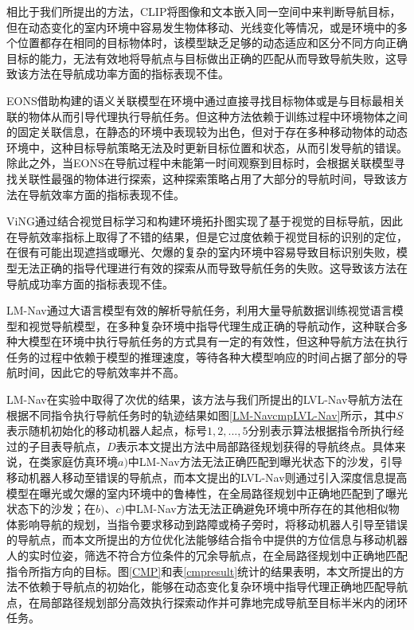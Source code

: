 相比于我们所提出的方法，CLIP将图像和文本嵌入同一空间中来判断导航目标，但在动态变化的室内环境中容易发生物体移动、光线变化等情况，或是环境中的多个位置都存在相同的目标物体时，该模型缺乏足够的动态适应和区分不同方向正确目标的能力，无法有效地将导航点与目标做出正确的匹配从而导致导航失败，这导致该方法在导航成功率方面的指标表现不佳。

EONS借助构建的语义关联模型在环境中通过直接寻找目标物体或是与目标最相关联的物体从而引导代理执行导航任务。但这种方法依赖于训练过程中环境物体之间的固定关联信息，在静态的环境中表现较为出色，但对于存在多种移动物体的动态环境中，这种目标导航策略无法及时更新目标位置和状态，从而引发导航的错误。除此之外，当EONS在导航过程中未能第一时间观察到目标时，会根据关联模型寻找关联性最强的物体进行探索，这种探索策略占用了大部分的导航时间，导致该方法在导航效率方面的指标表现不佳。

ViNG通过结合视觉目标学习和构建环境拓扑图实现了基于视觉的目标导航，因此在导航效率指标上取得了不错的结果，但是它过度依赖于视觉目标的识别的定位，在很有可能出现遮挡或曝光、欠爆的复杂的室内环境中容易导致目标识别失败，模型无法正确的指导代理进行有效的探索从而导致导航任务的失败。这导致该方法在导航成功率方面的指标表现不佳。

LM-Nav通过大语言模型有效的解析导航任务，利用大量导航数据训练视觉语言模型和视觉导航模型，在多种复杂环境中指导代理生成正确的导航动作，这种联合多种大模型在环境中执行导航任务的方式具有一定的有效性，但这种导航方法在执行任务的过程中依赖于模型的推理速度，等待各种大模型响应的时间占据了部分的导航时间，因此它的导航效率并不高。

LM-Nav在实验中取得了次优的结果，该方法与我们所提出的LVL-Nav导航方法在根据不同指令执行导航任务时的轨迹结果如图\ref{LM-NavcmpLVL-Nav}所示，其中$S$表示随机初始化的移动机器人起点，标号$1,2,...,5$分别表示算法根据指令所执行经过的子目表导航点，$D$表示本文提出方法中局部路径规划获得的导航终点。具体来说，在类家庭仿真环境$a)$中LM-Nav方法无法正确匹配到曝光状态下的沙发，引导移动机器人移动至错误的导航点，而本文提出的LVL-Nav则通过引入深度信息提高模型在曝光或欠爆的室内环境中的鲁棒性，在全局路径规划中正确地匹配到了曝光状态下的沙发；在$b)$、$c)$中LM-Nav方法无法正确避免环境中所存在的其他相似物体影响导航的规划，当指令要求移动到路障或椅子旁时，将移动机器人引导至错误的导航点，而本文所提出的方位优化法能够结合指令中提供的方位信息与移动机器人的实时位姿，筛选不符合方位条件的冗余导航点，在全局路径规划中正确地匹配指令所指方向的目标。图\ref{CMP}和表\ref{cmpresult}统计的结果表明，本文所提出的方法不依赖于导航点的初始化，能够在动态变化复杂环境中指导代理正确地匹配导航点，在局部路径规划部分高效执行探索动作并可靠地完成导航至目标半米内的闭环任务。


